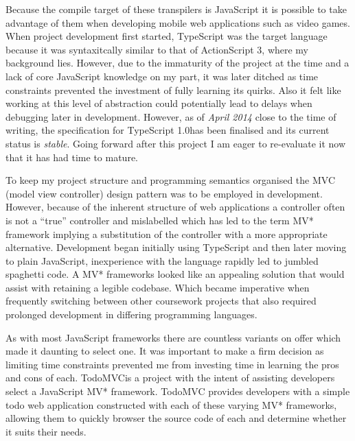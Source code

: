 \documentclass[final]{cmpreport}
\begin{document}
Because the compile target of these transpilers is JavaScript it is possible to take advantage of them when developing mobile web applications such as video games. When project development first started, TypeScript was the target language because it was syntaxitcally similar to that of ActionScript 3, where my background lies. However, due to the immaturity of the project at the time and a lack of core JavaScript knowledge on my part, it was later ditched as time constraints prevented the investment of fully learning its quirks. Also it felt like working at this level of abstraction could potentially lead to delays when debugging later in development. However, as of \textit{April 2014} close to the time of writing, the specification for TypeScript 1.0\footnotemark has been finalised and its current status is \textit{stable}. Going forward after this project I am eager to re-evaluate it now that it has had time to mature.


To keep my project structure and programming semantics organised the MVC (model view controller) design pattern was to be employed in development. However, because of the inherent structure of web applications a controller often is not a ``true'' controller and mislabelled which has led to the term MV* framework implying a substitution of the controller with a more appropriate alternative. Development began initially using TypeScript and then later moving to plain JavaScript, inexperience with the language rapidly led to jumbled spaghetti code. A MV* frameworks looked like an appealing solution that would assist with retaining a legible codebase.  Which became imperative when frequently switching between other coursework projects that also required prolonged development in differing programming languages.

As with most JavaScript frameworks there are countless variants on offer which made it daunting to select one. It was important to make a firm decision as limiting time constraints prevented me from investing time in learning the pros and cons of each. TodoMVC\footnotemark is a project with the intent of assisting developers select a JavaScript MV* framework. TodoMVC provides developers with a simple todo web application constructed with each of these varying MV* frameworks, allowing them to quickly browser the source code of each and determine whether it suits their needs.
\end{document}
